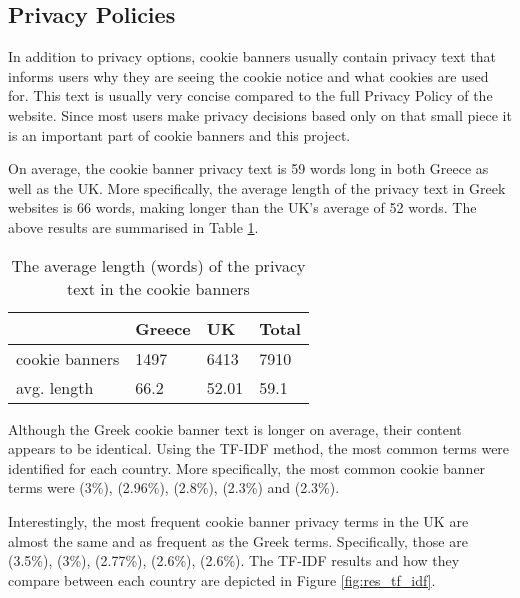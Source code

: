\documentclass[../main.tex]{subfiles}
\begin{document}
\subsection{Privacy Policies}
In addition to privacy options, cookie banners usually contain privacy text that informs users why they are seeing the cookie notice and what cookies are used for. This text is usually very concise compared to the full Privacy Policy of the website. Since most users make privacy decisions based only on that small piece it is an important part of cookie banners and this project.

On average, the cookie banner privacy text is 59 words long in both Greece as well as the UK. More specifically, the average length of the privacy text in Greek websites is 66 words, making longer than the UK’s average of 52 words. The above results are summarised in Table \ref{tab:privacy_txt_len}.

\begin{table}[ht]
    \centering
    \begin{tabular}{@{}llll@{}}
        \toprule
                       & Greece & UK    & Total \\ \midrule
        cookie banners & 1497   & 6413  & 7910  \\
        avg. length    & 66.2   & 52.01 & 59.1  \\ \bottomrule
    \end{tabular}
    \caption{The average length (words) of the privacy text in the cookie banners}
    \label{tab:privacy_txt_len}
\end{table}

Although the Greek cookie banner text is longer on average, their content appears to be identical. Using the TF-IDF method, the most common terms were identified for each country. More specifically, the most common cookie banner terms were  (3\%),  (2.96\%),  (2.8\%),  (2.3\%) and  (2.3\%). 

Interestingly, the most frequent cookie banner privacy terms in the UK are almost the same and as frequent as the Greek terms. Specifically, those are  (3.5\%),  (3\%),  (2.77\%),  (2.6\%),  (2.6\%). The TF-IDF results and how they compare between each country are depicted in Figure \ref{fig:res_tf_idf}.

\grTFIDF
\end{document}
